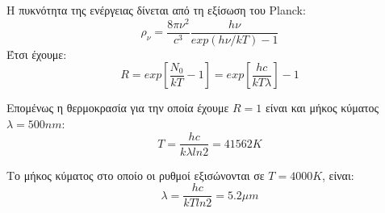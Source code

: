 \documentclass[a4paper,11pt,titlepage]{article}
\begin{document}
H πυκνότητα της ενέργειας δίνεται από τη εξίσωση του Planck:
\begin{equation}
 \rho_\nu=\frac{8\pi\nu^2}{c^3}\frac{h\nu}{exp(h\nu/kT)-1}
\end{equation}
Έτσι έχουμε:
\begin{equation}
 R=exp[\frac{N_0}{kT}-1]=exp[\frac{hc}{kT\lambda}]-1
\end{equation}

Επομένως η θερμοκρασία για την οποία έχουμε $R=1$ είναι και μήκος κύματος $\lambda=500nm$:
\begin{equation}
 T=\dfrac{hc}{k{\lambda}ln2}=41562K
\end{equation}

Το μήκος κύματος στο οποίο οι ρυθμοί εξισώνονται σε $T=4000K$, είναι:
\begin{equation}
 \lambda=\frac{hc}{kTln2}=5.2{\mu}m
\end{equation}
\end{document}
